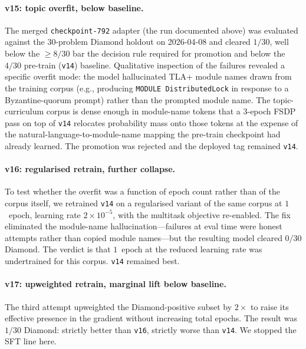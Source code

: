 \documentclass[11pt]{article}
\begin{document}
\paragraph{v15: topic overfit, below baseline.} The merged
\texttt{checkpoint-792} adapter (the run documented above) was
evaluated against the $30$-problem Diamond holdout on 2026-04-08 and
cleared $1/30$, well below the $\ge 8/30$ bar the decision rule
required for promotion and below the $4/30$ pre-train
(\texttt{v14}) baseline. Qualitative inspection of the failures
revealed a specific overfit mode: the model hallucinated TLA+ module
names drawn from the training corpus (e.g., producing
\texttt{MODULE DistributedLock} in response to a Byzantine-quorum
prompt) rather than the prompted module name. The topic-curriculum
corpus is dense enough in module-name tokens that a $3$-epoch FSDP
pass on top of \texttt{v14} relocates probability mass onto those
tokens at the expense of the natural-language-to-module-name mapping
the pre-train checkpoint had already learned. The promotion was
rejected and the deployed tag remained \texttt{v14}.

\paragraph{v16: regularised retrain, further collapse.} To test
whether the overfit was a function of epoch count rather than of the
corpus itself, we retrained \texttt{v14} on a regularised variant of
the same corpus at $1$~epoch, learning rate $2\!\times\!10^{-5}$,
with the multitask objective re-enabled. The fix eliminated the
module-name hallucination---failures at eval time were honest
attempts rather than copied module names---but the resulting model
cleared $0/30$ Diamond. The verdict is that $1$~epoch at the reduced
learning rate was undertrained for this corpus. \texttt{v14} remained
best.

\paragraph{v17: upweighted retrain, marginal lift below baseline.} The
third attempt upweighted the Diamond-positive subset by $2\!\times$
to raise its effective presence in the gradient without increasing
total epochs. The result was $1/30$ Diamond: strictly better than
\texttt{v16}, strictly worse than \texttt{v14}. We stopped the SFT
line here.
\end{document}

